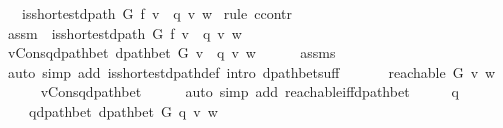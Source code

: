 \begin{isabellebody}
\ \ \ {\isachardoublequoteopen}is{\isacharunderscore}{\kern0pt}shortest{\isacharunderscore}{\kern0pt}dpath\ G\ f\ {\isacharparenleft}{\kern0pt}v\ {\isacharhash}{\kern0pt}\ q{\isacharparenright}{\kern0pt}\ v\ w{\isachardoublequoteclose}%
\endisataginvisible
{\isafoldinvisible}%
%
\isadeliminvisible
\isanewline
%
\endisadeliminvisible
%
\isadelimproof
%
\endisadelimproof
%
\isatagproof
{}\isamarkupfalse%
\ {\isacharparenleft}{\kern0pt}rule\ ccontr{\isacharparenright}{\kern0pt}\isanewline
\ \ \isamarkupfalse%
\ assm{\isacharcolon}{\kern0pt}\ {\isachardoublequoteopen}{\isasymnot}\ is{\isacharunderscore}{\kern0pt}shortest{\isacharunderscore}{\kern0pt}dpath\ G\ f\ {\isacharparenleft}{\kern0pt}v\ {\isacharhash}{\kern0pt}\ q{\isacharparenright}{\kern0pt}\ v\ w{\isachardoublequoteclose}\isanewline
\ \ \isamarkupfalse%
\ v{\isacharunderscore}{\kern0pt}Cons{\isacharunderscore}{\kern0pt}q{\isacharunderscore}{\kern0pt}dpath{\isacharunderscore}{\kern0pt}bet{\isacharcolon}{\kern0pt}\ {\isachardoublequoteopen}dpath{\isacharunderscore}{\kern0pt}bet\ G\ {\isacharparenleft}{\kern0pt}v\ {\isacharhash}{\kern0pt}\ q{\isacharparenright}{\kern0pt}\ v\ w{\isachardoublequoteclose}\isanewline
\ \ \ \ \isamarkupfalse%
\ assms\isanewline
\ \ \ \ \isamarkupfalse%
\ {\isacharparenleft}{\kern0pt}auto\ simp\ add{\isacharcolon}{\kern0pt}\ is{\isacharunderscore}{\kern0pt}shortest{\isacharunderscore}{\kern0pt}dpath{\isacharunderscore}{\kern0pt}def\ intro{\isacharcolon}{\kern0pt}\ dpath{\isacharunderscore}{\kern0pt}bet{\isacharunderscore}{\kern0pt}suff{\isacharparenright}{\kern0pt}\isanewline
\ \ \isanewline
\ \ \isamarkupfalse%
\ {\isachardoublequoteopen}reachable\ G\ v\ w{\isachardoublequoteclose}\isanewline
\ \ \ \ \isamarkupfalse%
\ v{\isacharunderscore}{\kern0pt}Cons{\isacharunderscore}{\kern0pt}q{\isacharunderscore}{\kern0pt}dpath{\isacharunderscore}{\kern0pt}bet\isanewline
\ \ \ \ \isamarkupfalse%
\ {\isacharparenleft}{\kern0pt}auto\ simp\ add{\isacharcolon}{\kern0pt}\ reachable{\isacharunderscore}{\kern0pt}iff{\isacharunderscore}{\kern0pt}dpath{\isacharunderscore}{\kern0pt}bet{\isacharparenright}{\kern0pt}\isanewline
\ \ \isamarkupfalse%
\ \isamarkupfalse%
\ q{\isacharprime}{\kern0pt}\ \isanewline
\ \ \ \ q{\isacharprime}{\kern0pt}{\isacharunderscore}{\kern0pt}dpath{\isacharunderscore}{\kern0pt}bet{\isacharcolon}{\kern0pt}\ {\isachardoublequoteopen}dpath{\isacharunderscore}{\kern0pt}bet\ G\ q{\isacharprime}{\kern0pt}\ v\ w{\isachardoublequoteclose}\ \isanewline

\end{isabellebody}
